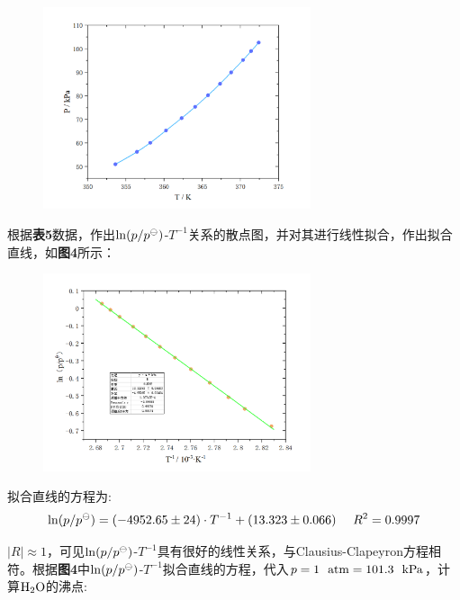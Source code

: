 \documentclass[12pt]{article}
\begin{document}
		\begin{figure}[!h]
			\centering
			\includegraphics[width=0.7\textwidth]{3.png}
		\end{figure}
		\par
		根据\textbf{表5}数据，作出${\rm ln}(p/p^{\ominus})$-$T^{-1}$关系的散点图，并对其进行线性拟合，作出拟合直线，如\textbf{图4}所示：
		\begin{figure}[!h]
			\centering
			\includegraphics[width=0.7\textwidth]{4.png}
		\end{figure}
		\par
		拟合直线的方程为:
		$$
			{\rm ln}(p/p^{\ominus})=(-4952.65\pm 24)\cdot T^{-1}+(13.323 \pm 0.066) \ \ \ \ R^{2}=0.9997
		$$
		\par
		$|R|\approx 1$，可见${\rm ln}(p/p^{\ominus})$-$T^{-1}$具有很好的线性关系，与Clausius-Clapeyron方程相符。根据\textbf{图4}中${\rm ln}(p/p^{\ominus})$-$T^{-1}$拟合直线的方程，代入$p=1\ \ {\rm atm}=101.3\ \ {\rm kPa}$，计算$\rm H_{2}O$的沸点:\par 
\end{document}
